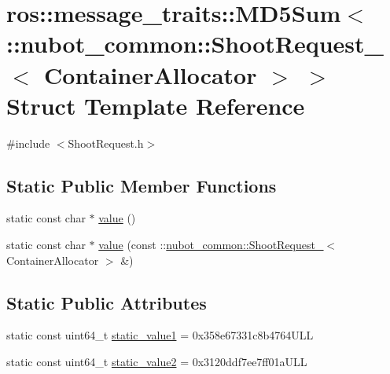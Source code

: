 \hypertarget{structros_1_1message__traits_1_1MD5Sum_3_01_1_1nubot__common_1_1ShootRequest___3_01ContainerAllocator_01_4_01_4}{\section{ros\-:\-:message\-\_\-traits\-:\-:M\-D5\-Sum$<$ \-:\-:nubot\-\_\-common\-:\-:Shoot\-Request\-\_\-$<$ Container\-Allocator $>$ $>$ Struct Template Reference}
\label{structros_1_1message__traits_1_1MD5Sum_3_01_1_1nubot__common_1_1ShootRequest___3_01ContainerAllocator_01_4_01_4}
}


{\ttfamily \#include $<$Shoot\-Request.\-h$>$}

\subsection*{Static Public Member Functions}
\begin{DoxyCompactItemize}
\item 
static const char $\ast$ \hyperlink{structros_1_1message__traits_1_1MD5Sum_3_01_1_1nubot__common_1_1ShootRequest___3_01ContainerAllocator_01_4_01_4_aa30c0a2db4491a0497b32e387321d890}{value} ()
\item 
static const char $\ast$ \hyperlink{structros_1_1message__traits_1_1MD5Sum_3_01_1_1nubot__common_1_1ShootRequest___3_01ContainerAllocator_01_4_01_4_ad4a7a7a0736e3c4e2f384f3635bcc0f7}{value} (const \-::\hyperlink{structnubot__common_1_1ShootRequest__}{nubot\-\_\-common\-::\-Shoot\-Request\-\_\-}$<$ Container\-Allocator $>$ \&)
\end{DoxyCompactItemize}
\subsection*{Static Public Attributes}
\begin{DoxyCompactItemize}
\item 
static const uint64\-\_\-t \hyperlink{structros_1_1message__traits_1_1MD5Sum_3_01_1_1nubot__common_1_1ShootRequest___3_01ContainerAllocator_01_4_01_4_aff1848cc43b0ea7294de9e3916056f8e}{static\-\_\-value1} = 0x358e67331c8b4764\-U\-L\-L
\item 
static const uint64\-\_\-t \hyperlink{structros_1_1message__traits_1_1MD5Sum_3_01_1_1nubot__common_1_1ShootRequest___3_01ContainerAllocator_01_4_01_4_a83668cd50304ae0cd7e14657b7a2adb4}{static\-\_\-value2} = 0x3120ddf7ee7ff01a\-U\-L\-L
\end{DoxyCompactItemize}


